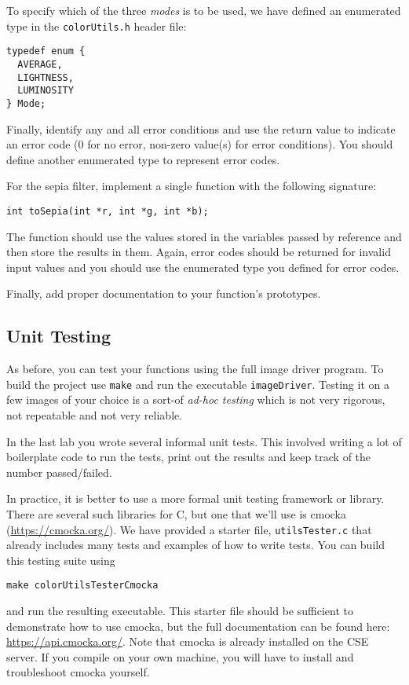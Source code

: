 \documentclass[12pt]{scrartcl}
\begin{document}
To specify which of the three \emph{modes} is to be used, we have
defined an enumerated type in the \texttt{colorUtils.h}
header file:
\begin{verbatim}
typedef enum {
  AVERAGE,
  LIGHTNESS,
  LUMINOSITY
} Mode;
\end{verbatim}
Finally, identify any and all error conditions and use the return 
value to indicate an error code (0 for no error, non-zero value(s) 
for error conditions).  You should define another enumerated type
to represent error codes.

For the sepia filter, implement a single function with the following
signature:

\texttt{int toSepia(int *r, int *g, int *b);}

The function should use the values stored in the variables passed
by reference and then store the results in them.  Again, error codes
should be returned for invalid input values and you should use the
enumerated type you defined for error codes.

Finally, add proper documentation to your function's prototypes.

\subsection{Unit Testing}

As before, you can test your functions using the full image driver
program.  To build the project use \texttt{make} and
run the executable \texttt{imageDriver}.  Testing it on
a few images of your choice is a sort-of \emph{ad-hoc testing} which
is not very rigorous, not repeatable and not very reliable.  

In the last lab you wrote several informal unit tests.  This involved
writing a lot of boilerplate code to run the tests, print out the
results and keep track of the number passed/failed.  

In practice, it is better to use a more formal unit testing framework
or library.  There are several such libraries for C, but one that 
we'll use is cmocka (\url{https://cmocka.org/}).  We have provided
a starter file, \texttt{utilsTester.c} that already includes
many tests and examples of how to write tests.  You can build this
testing suite using 

\texttt{make colorUtilsTesterCmocka}

and run the resulting executable.  This starter file should be 
sufficient to demonstrate how to use cmocka, but the full documentation 
can be found here: \url{https://api.cmocka.org/}.  Note that cmocka 
is already installed on the CSE server.  If you compile on your own 
machine, you will have to install and troubleshoot cmocka yourself.  
\end{document}
